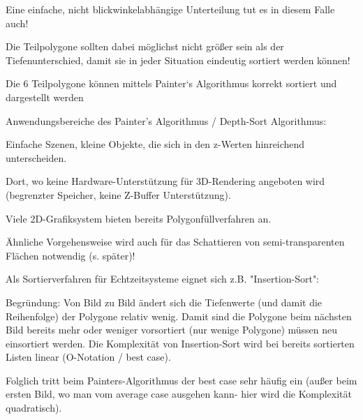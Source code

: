 \documentclass[landscape]{article}
\begin{document}
\begin{multicols}{3}
  
  \begin{itemize*}
    \item Eine einfache, nicht blickwinkelabhängige Unterteilung tut es in diesem Falle auch!
    \item Die Teilpolygone sollten dabei möglichst nicht größer sein als der Tiefenunterschied, damit sie in jeder Situation eindeutig sortiert werden können!
    \item Die 6 Teilpolygone können mittels Painter‘s Algorithmus korrekt sortiert und dargestellt werden
  \end{itemize*}
  
  Anwendungsbereiche des Painter's Algorithmus / Depth-Sort Algorithmus:
  \begin{itemize*}
    \item Einfache Szenen, kleine Objekte, die sich in den z-Werten hinreichend unterscheiden.
    \item Dort, wo keine Hardware-Unterstützung für 3D-Rendering angeboten wird (begrenzter Speicher, keine Z-Buffer Unterstützung).
    \item Viele 2D-Grafiksystem bieten bereits Polygonfüllverfahren an.
    \item Ähnliche Vorgehensweise wird auch für das Schattieren von semi-transparenten Flächen notwendig (s. später)!
  \end{itemize*}
  
  Als Sortierverfahren für Echtzeitsysteme eignet sich z.B. "Insertion-Sort":
  \begin{itemize*}
    \item Begründung: Von Bild zu Bild ändert sich die Tiefenwerte (und damit die Reihenfolge) der Polygone relativ wenig. Damit sind die Polygone beim nächsten Bild bereits mehr oder weniger vorsortiert (nur wenige Polygone) müssen neu einsortiert werden. Die Komplexität von Insertion-Sort wird bei bereits sortierten Listen linear (O-Notation / best case).
    \item Folglich tritt beim Painters-Algorithmus der best case sehr häufig ein (außer beim ersten Bild, wo man vom average case ausgehen kann- hier wird die Komplexität quadratisch).
  \end{itemize*}
  

\end{multicols}
\end{document}
